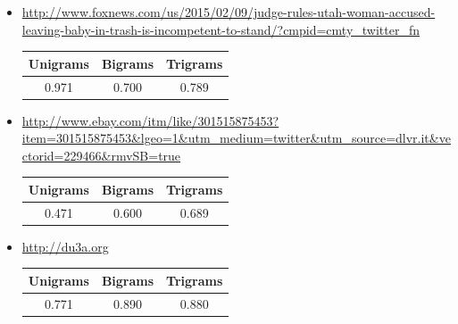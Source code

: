 \begin{itemize}
\item \url{http://www.foxnews.com/us/2015/02/09/judge-rules-utah-woman-accused-leaving-baby-in-trash-is-incompetent-to-stand/?cmpid=cmty_twitter_fn}\\
\begin{tabular}{|c|c|c|}
    \hline
    Unigrams & Bigrams & Trigrams\\
    \hline
    0.971 & 0.700 & 0.789\\
    \hline
\end{tabular}

\item \url{http://www.ebay.com/itm/like/301515875453?item=301515875453&lgeo=1&utm_medium=twitter&utm_source=dlvr.it&vectorid=229466&rmvSB=true}\\
\begin{tabular}{|c|c|c|}
    \hline
    Unigrams & Bigrams & Trigrams\\
    \hline
    0.471 & 0.600 & 0.689\\
    \hline
\end{tabular}

\item  
\url{http://du3a.org}\\
\begin{tabular}{|c|c|c|}
    \hline
    Unigrams & Bigrams & Trigrams\\
    \hline
    0.771 & 0.890 & 0.880\\
    \hline
\end{tabular}
\end{itemize}




